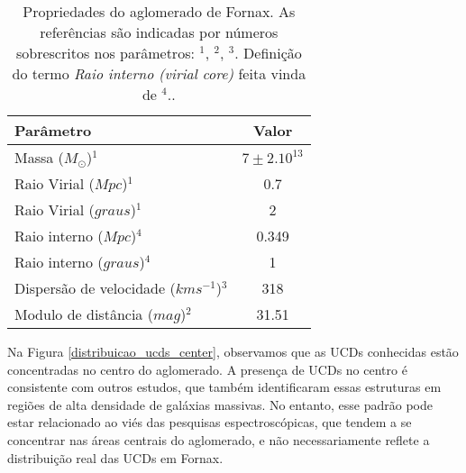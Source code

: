 \begin{table}[!ht]
    \centering    
    \caption{Propriedades do aglomerado de Fornax. As referências são indicadas por números sobrescritos nos parâmetros: $^1$\citealp{Drinkwater_2001}, $^2$\citealp{Blakeslee_2009}, $^3$\citealp{Maddox_2019}. Definição do termo \textit{Raio interno (virial core)} feita vinda de $^4$\cite{Saifollahi_2021}..}   
    \begin{tabular}{lc}
        \toprule
        Parâmetro &  Valor\\
        \midrule
        Massa ($M_\odot$)$^1$ & $7\pm 2. 10^{13}$ \\
        Raio Virial ($Mpc$)$^1$ & 0.7 \\
        Raio Virial ($graus$)$^1$ & 2 \\
        Raio interno ($Mpc$)$^4$ & 0.349 \\
        Raio interno ($graus$)$^4$ & 1 \\
        Dispersão de velocidade ($km s^{-1}$)$^3$ & 318 \\
        Modulo de distância ($mag$)$^2$ & 31.51 \\
        \bottomrule
    \end{tabular}
    \label{tab:properties_fornax}
\end{table}

Na Figura \ref{distribuicao_ucds_center}, observamos que as UCDs conhecidas estão concentradas no centro do aglomerado. A presença de UCDs no centro é consistente com outros estudos, que também identificaram essas estruturas em regiões de alta densidade de galáxias massivas. No entanto, esse padrão pode estar relacionado ao viés das pesquisas espectroscópicas, que tendem a se concentrar nas áreas centrais do aglomerado, e não necessariamente reflete a distribuição real das UCDs em Fornax.


